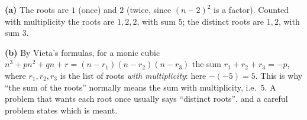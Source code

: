 \textbf{(a)} The roots are $1$ (once) and $2$ (twice, since $(n-2)^2$ is a factor). Counted with multiplicity the roots are $1,2,2$, with sum $\boxed{5}$; the distinct roots are $1,2$, with sum $\boxed{3}$.

\textbf{(b)} By Vieta's formulas, for a monic cubic $n^3+pn^2+qn+r=(n-r_1)(n-r_2)(n-r_3)$ the sum $r_1+r_2+r_3=-p$, where $r_1,r_2,r_3$ is the list of roots \emph{with multiplicity}: here $-(-5)=5$. This is why ``the sum of the roots'' normally means the sum with multiplicity, i.e.\ $5$. A problem that wants each root once usually says ``distinct roots'', and a careful problem states which is meant.
